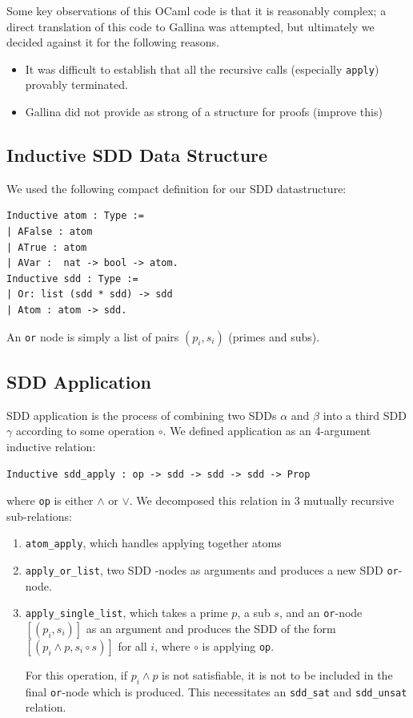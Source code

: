 \documentclass[twocolumn]{article}
\theoremstyle{definition}
\begin{document}
Some key observations of this OCaml code is that it is reasonably complex; a
direct translation of this code to Gallina was attempted, but ultimately we
decided against it for the following reasons.

\begin{itemize}
\item It was difficult to establish that all the recursive calls (especially
  \texttt{apply}) provably terminated.
\item Gallina did not provide as strong of a structure for proofs (improve this)
\end{itemize} 

\subsection{Inductive SDD Data Structure}
We used the following compact definition for our SDD datastructure:
\begin{verbatim}
Inductive atom : Type :=
| AFalse : atom
| ATrue : atom
| AVar :  nat -> bool -> atom.
Inductive sdd : Type :=
| Or: list (sdd * sdd) -> sdd
| Atom : atom -> sdd.
\end{verbatim}
An \texttt{or} node is simply a list of pairs $(p_i, s_i)$ (primes and subs).
\subsection{SDD Application}
SDD application is the process of combining two SDDs $\alpha$ and $\beta$ into a
third SDD $\gamma$ according to some operation $\circ$. We defined application
as an 4-argument inductive relation:
\begin{verbatim}
Inductive sdd_apply : op -> sdd -> sdd -> sdd -> Prop
\end{verbatim}

where \texttt{op} is either $\land$ or $\lor$. We decomposed this relation in 3
mutually recursive sub-relations:
\begin{enumerate}
\item \texttt{atom\_apply}, which handles applying together atoms
\item \texttt{apply\_or\_list}, two SDD -nodes as arguments and
  produces a new SDD \texttt{or}-node.
\item \texttt{apply\_single\_list}, which takes a prime $p$, a sub $s$, and an
  \texttt{or}-node $[(p_i, s_i)]$ as an argument and produces the SDD of the
  form $[(p_i \land p, s_i \circ s)]$ for all $i$, where $\circ$ is applying
  \texttt{op}.

  For this operation, if $p_i \land p$ is not satisfiable, it is not to be
  included in the final \texttt{or}-node which is produced. This necessitates
  an \texttt{sdd\_sat} and \texttt{sdd\_unsat} relation.
\end{enumerate}
\end{document}
